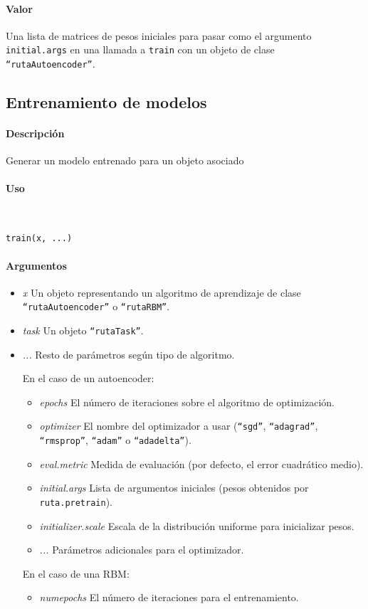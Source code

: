 \paragraph{Valor}
Una lista de matrices de pesos iniciales para pasar como el argumento \texttt{initial.args} en una llamada a \texttt{train} con un objeto de clase \texttt{``rutaAutoencoder''}.


\subsection{Entrenamiento de modelos}

\paragraph{Descripción}
Generar un modelo entrenado para un objeto asociado 

\paragraph{Uso}
~

\begin{lstlisting}
train(x, ...)
\end{lstlisting}

\paragraph{Argumentos}
\begin{itemize}
\item \emph{x}	Un objeto representando un algoritmo de aprendizaje de clase \texttt{``rutaAutoencoder''} o \texttt{``rutaRBM''}.
\item \emph{task}	Un objeto \texttt{``rutaTask''}.
\item \emph{...} Resto de parámetros según tipo de algoritmo.

  En el caso de un autoencoder:
  \begin{itemize}
  \item \emph{epochs}	El número de iteraciones sobre el algoritmo de optimización.
  \item \emph{optimizer} El nombre del optimizador a usar (\texttt{``sgd''}, \texttt{``adagrad''}, \texttt{``rmsprop''}, \texttt{``adam''} o \texttt{``adadelta''}).
  \item \emph{eval.metric} Medida de evaluación (por defecto, el error cuadrático medio).
  \item \emph{initial.args} Lista de argumentos iniciales (pesos obtenidos por \texttt{ruta.pretrain}).
  \item \emph{initializer.scale} Escala de la distribución uniforme para inicializar pesos.
  \item \emph{...} Parámetros adicionales para el optimizador.
  \end{itemize}

  En el caso de una RBM:
  \begin{itemize}
  \item \emph{numepochs} El número de iteraciones para el entrenamiento.
  \end{itemize}
\end{itemize}

